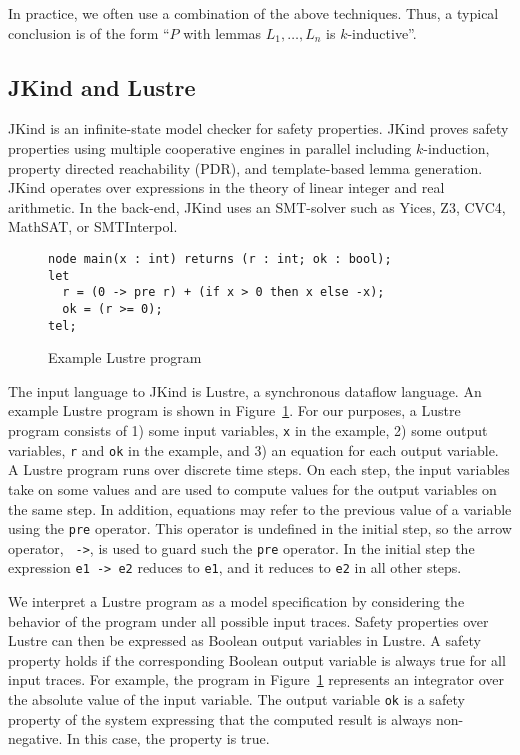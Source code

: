 In practice, we often use a combination of the above techniques. Thus,
a typical conclusion is of the form ``$P$ with lemmas $L_1, \ldots, L_n$
is $k$-inductive''.

\subsection{JKind and Lustre}


JKind is an infinite-state model checker for safety properties. JKind
proves safety properties using multiple cooperative engines in
parallel including $k$-induction, property directed reachability
(PDR), and template-based lemma generation. JKind operates over
expressions in the theory of linear integer and real arithmetic. In
the back-end, JKind uses an SMT-solver such as Yices, Z3, CVC4,
MathSAT, or SMTInterpol.

\begin{figure}[t]
\begin{verbatim}
node main(x : int) returns (r : int; ok : bool);
let
  r = (0 -> pre r) + (if x > 0 then x else -x);
  ok = (r >= 0);
tel;
\end{verbatim}
  \caption{Example Lustre program}
  \label{fig:lustre-ex}
\end{figure}

The input language to JKind is Lustre, a synchronous dataflow language.
An example Lustre program is shown in Figure~\ref{fig:lustre-ex}. For
our purposes, a Lustre program consists of 1) some input variables,
{\tt x} in the example, 2) some output variables, {\tt r} and {\tt ok}
in the example, and 3) an equation for each output variable. A Lustre
program runs over discrete time steps. On each step, the input
variables take on some values and are used to compute values for the
output variables on the same step. In addition, equations may refer to
the previous value of a variable using the {\tt pre} operator. This
operator is undefined in the initial step, so the arrow operator, {\tt
  ->}, is used to guard such the {\tt pre} operator. In the initial
step the expression {\tt e1 -> e2} reduces to {\tt e1}, and it
reduces to {\tt e2} in all other steps.

We interpret a Lustre program as a model specification by considering
the behavior of the program under all possible input traces. Safety
properties over Lustre can then be expressed as Boolean output
variables in Lustre. A safety property holds if the corresponding
Boolean output variable is always true for all input traces. For
example, the program in Figure~\ref{fig:lustre-ex} represents an
integrator over the absolute value of the input variable. The output
variable {\tt ok} is a safety property of the system expressing that
the computed result is always non-negative. In this case, the property
is true.

